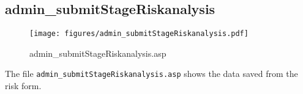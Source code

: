 \subsection{admin\_submitStageRiskanalysis}
\begin{figure}[htb]
    \begin{center}
        \texttt{[image: figures/admin\_submitStageRiskanalysis.pdf]}
    \end{center}
    \caption{admin\_submitStageRiskanalysis.asp}
    \label{fig:admin_submitStageRiskanalysis}
\end{figure}

The file \verb|admin_submitStageRiskanalysis.asp| shows the data saved from the
risk form.
